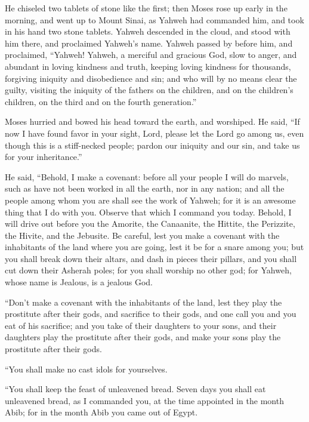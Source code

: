  He chiseled two tablets of stone like the first; then
Moses rose up early in the morning, and went up to Mount Sinai, as
Yahweh had commanded him, and took in his hand two stone tablets.
 Yahweh descended in the cloud, and stood with him there,
and proclaimed Yahweh's name.  Yahweh passed by before
him, and proclaimed, ``Yahweh! Yahweh, a merciful and gracious God, slow
to anger, and abundant in loving kindness and truth, 
keeping loving kindness for thousands, forgiving iniquity and
disobedience and sin; and who will by no means clear the guilty,
visiting the iniquity of the fathers on the children, and on the
children's children, on the third and on the fourth generation.''

 Moses hurried and bowed his head toward the earth, and
worshiped.  He said, ``If now I have found favor in your
sight, Lord, please let the Lord go among us, even though this is a
stiff-necked people; pardon our iniquity and our sin, and take us for
your inheritance.''

 He said, ``Behold, I make a covenant: before all your
people I will do marvels, such as have not been worked in all the earth,
nor in any nation; and all the people among whom you are shall see the
work of Yahweh; for it is an awesome thing that I do with you.
 Observe that which I command you today. Behold, I will
drive out before you the Amorite, the Canaanite, the Hittite, the
Perizzite, the Hivite, and the Jebusite.  Be careful,
lest you make a covenant with the inhabitants of the land where you are
going, lest it be for a snare among you;  but you shall
break down their altars, and dash in pieces their pillars, and you shall
cut down their Asherah poles;  for you shall worship no
other god; for Yahweh, whose name is Jealous, is a jealous God.

 ``Don't make a covenant with the inhabitants of the
land, lest they play the prostitute after their gods, and sacrifice to
their gods, and one call you and you eat of his sacrifice;
 and you take of their daughters to your sons, and their
daughters play the prostitute after their gods, and make your sons play
the prostitute after their gods.

 ``You shall make no cast idols for yourselves.

 ``You shall keep the feast of unleavened bread. Seven
days you shall eat unleavened bread, as I commanded you, at the time
appointed in the month Abib; for in the month Abib you came out of
Egypt.

